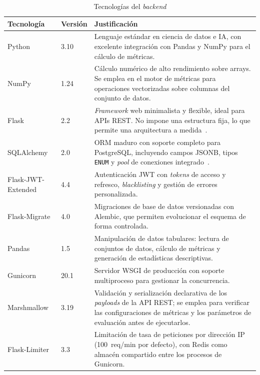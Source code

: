 \begin{table}[t]
  \centering
  \caption{Tecnologías del \emph{backend}}
  \label{tab:tech-backend}
  \begin{tabularx}{\textwidth}{l l X}
    \toprule
    \textbf{Tecnología} & \textbf{Versión} & \textbf{Justificación} \\
    \midrule
    Python    & 3.10 & Lenguaje estándar en ciencia de datos e \ac{IA}, con
      excelente integración con Pandas y NumPy para el cálculo de
      métricas. \\
    NumPy     & 1.24 & Cálculo numérico de alto rendimiento sobre arrays.
      Se emplea en el motor de métricas para operaciones vectorizadas sobre
      columnas del conjunto de datos. \\
    Flask     & 2.2  & \emph{Framework} web minimalista y flexible, ideal
      para \ac{API}s \ac{REST}.  No impone una estructura fija, lo que
      permite una arquitectura a medida~\citep{flask}. \\
    SQLAlchemy & 2.0 & \ac{ORM} maduro con soporte completo para PostgreSQL,
      incluyendo campos JSONB, tipos \texttt{ENUM} y \emph{pool} de
      conexiones integrado~\citep{sqlalchemy}. \\
    Flask-JWT-Extended & 4.4 & Autenticación \ac{JWT} con \emph{tokens} de
      acceso y refresco, \emph{blacklisting} y gestión de errores
      personalizada. \\
    Flask-Migrate & 4.0 & Migraciones de base de datos versionadas con
      Alembic, que permiten evolucionar el esquema de forma controlada. \\
    Pandas    & 1.5  & Manipulación de datos tabulares: lectura de conjuntos
      de datos, cálculo de métricas y generación de estadísticas
      descriptivas. \\
    Gunicorn  & 20.1 & Servidor \ac{WSGI} de producción con soporte
      multiproceso para gestionar la concurrencia. \\
    Marshmallow & 3.19 & Validación y serialización declarativa de los
      \emph{payloads} de la \ac{API} \ac{REST}; se emplea para verificar
      las configuraciones de métricas y los parámetros de evaluación
      antes de ejecutarlos. \\
    Flask-Limiter & 3.3 & Limitación de tasa de peticiones por
      dirección IP (100~req/min por defecto), con Redis como almacén
      compartido entre los procesos de Gunicorn. \\
    \bottomrule
  \end{tabularx}
\end{table}

